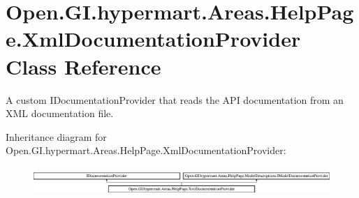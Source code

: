 \hypertarget{class_open_1_1_g_i_1_1hypermart_1_1_areas_1_1_help_page_1_1_xml_documentation_provider}{}\section{Open.\+G\+I.\+hypermart.\+Areas.\+Help\+Page.\+Xml\+Documentation\+Provider Class Reference}
\label{class_open_1_1_g_i_1_1hypermart_1_1_areas_1_1_help_page_1_1_xml_documentation_provider}


A custom I\+Documentation\+Provider that reads the A\+P\+I documentation from an X\+M\+L documentation file.  


Inheritance diagram for Open.\+G\+I.\+hypermart.\+Areas.\+Help\+Page.\+Xml\+Documentation\+Provider\+:\begin{figure}[H]
\begin{center}
\leavevmode
\includegraphics[height=1.102362cm]{class_open_1_1_g_i_1_1hypermart_1_1_areas_1_1_help_page_1_1_xml_documentation_provider}
\end{center}
\end{figure}
